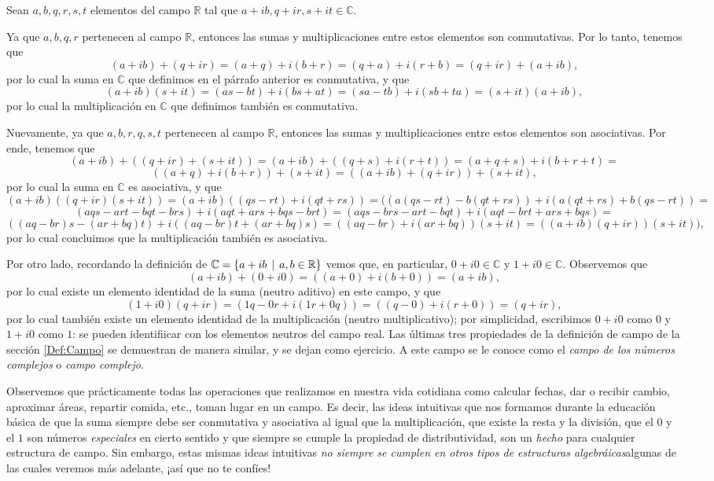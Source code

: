 \documentclass[12pt]{article}
\begin{document}
Sean $a,b,q,r,s,t$ elementos del campo $\mathbb{R}$ tal que $a+ib, q+ir, s+it\in\mathbb{C}.$

Ya que $a,b,q,r$ pertenecen al campo $\mathbb{R}$, entonces las sumas y multiplicaciones entre estos elementos son conmutativas. Por lo tanto, tenemos que $$(a+ib)+(q+ir)=(a+q)+i(b+r)=(q+a)+i(r+b)=(q+ir)+(a+ib),$$\noindent por lo cual la suma en $\mathbb{C}$ que definimos en el párrafo anterior es conmutativa, y que $$(a+ib)(s+it)=(as-bt)+i(bs+at)=(sa-tb)+i(sb+ta)=(s+it)(a+ib),$$\noindent por lo cual la multiplicación en $\mathbb{C}$ que definimos también es conmutativa.

Nuevamente, ya que $a,b,r,q,s,t$ pertenecen al campo $\mathbb{R}$, entonces las sumas y multiplicaciones entre estos elementos son asociativas. Por ende, tenemos que $$(a+ib)+((q+ir)+(s+it))=(a+ib)+((q+s)+i(r+t))=(a+q+s)+i(b+r+t)=$$ $$((a+q)+i(b+r))+(s+it)=((a+ib)+(q+ir))+(s+it),$$ por lo cual la suma en $\mathbb{C}$ es asociativa, y que $$(a+ib)((q+ir)(s+it))=(a+ib)((qs-rt)+i(qt+rs))=((a(qs-rt)-b(qt+rs))+i(a(qt+rs)+b(qs-rt))=$$ $$(aqs-art-bqt-brs)+i(aqt+ars+bqs-brt)=(aqs-brs-art-bqt)+i(aqt-brt+ars+bqs)=$$ $$((aq-br)s-(ar+bq)t)+i((aq-br)t+(ar+bq)s)=((aq-br)+i(ar+bq))(s+it)=((a+ib)(q+ir))(s+it)),$$\noindent por lo cual concluimos que la multiplicación también es asociativa.

Por otro lado, recordando la definición de $\mathbb{C}=\{a+ib\hspace{1.5mm}|\hspace{1.5mm}a,b\in\mathbb{R}\}$ vemos que, en particular, $0+i0\in\mathbb{C}$ y $1+i0\in\mathbb{C}$. Observemos que $$(a+ib)+(0+i0)=((a+0)+i(b+0))=(a+ib),$$ por lo cual existe un elemento identidad de la suma (neutro aditivo) en este campo, y que $$(1+i0)(q+ir)=(1q-0r+i(1r+0q))=((q-0)+i(r+0))=(q+ir),$$ \noindent por lo cual también existe un elemento identidad de la multiplicación (neutro multiplicativo); por simplicidad, escribimos $0+i0$ como $0$ y $1+i0$ como $1$: se pueden identifiicar con los elementos neutros del campo real. Las últimas tres propiedades de la definición de campo de la sección \ref{Def:Campo} se demuestran de manera similar, y se dejan como ejercicio. A este campo se le conoce como el \emph{campo de los números complejos} o \emph{campo complejo}.

Observemos que prácticamente todas las operaciones que realizamos en nuestra vida cotidiana como calcular fechas, dar o recibir cambio, aproximar áreas, repartir comida, etc., toman lugar en un campo. Es decir, las ideas intuitivas que nos formamos durante la educación básica de que la suma siempre debe ser conmutativa y asociativa \textemdash al igual que la multiplicación\textemdash\hspace{0.5mm}, que existe la resta y la división, que el $0$ y el $1$ son números \emph{especiales} en cierto sentido y que siempre se cumple la propiedad de distributividad, son un \emph{hecho} para cualquier estructura de campo. Sin embargo, estas mismas ideas intuitivas \emph{no siempre se cumplen en otros tipos de estructuras algebráicas}\textemdash algunas de las cuales veremos más adelante\textemdash\hspace{0.5mm}, ¡así que no te confíes!
\end{document}
